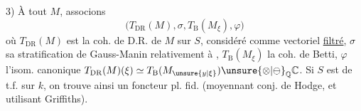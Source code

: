 3) À tout $M$, associons
\[
\bigl(T_{\mathrm{DR}}(M),\sigma,T_{\mathrm B}(M_\xi),\varphi\bigr)
\]
où $T_{\mathrm{DR}}(M)$ est la coh. de D.R. de $M$ sur $S$, considéré comme vectoriel \uline{filtré}, $\sigma$ sa stratification de Gauss-Manin relativement à , $T_{\mathrm B}(M_\xi)$ la coh. de Betti,
$\varphi$ l'isom. canonique $T_{\mathrm{DR}}(M)(\xi)\simeq T_{\mathrm B}(M_{\unsure{y|\xi}})\unsure{\otimes|\ominus}_{\mathbb Q}\mathbb C$. Si $S$ est de t.f. sur $k$, on trouve ainsi un foncteur pl. fid. (moyennant conj. de Hodge, et utilisant Griffiths).


